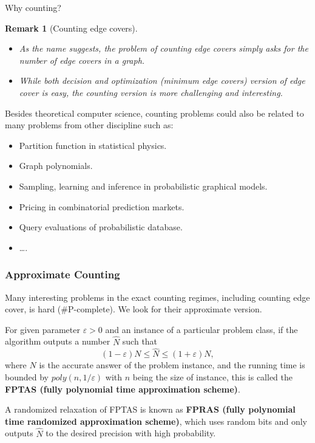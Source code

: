 \documentclass[mathserif]{beamer}
\newtheorem{remark}[theorem]{Remark}
\newcommand{\eps}{\varepsilon}
\begin{document}
\begin{frame}{Why counting?}
	\begin{remark}[Counting edge covers]
		\begin{itemize}
			\item As the name suggests, the problem of counting edge covers simply asks for the number of edge covers in a graph.
			\item While both decision and optimization (minimum edge covers) version of edge cover is easy, the counting version is more challenging and interesting.
		\end{itemize}
	\end{remark}

	\bigskip
	\pause
Besides theoretical computer science, counting problems could also be related to many problems from other discipline such as:
\begin{itemize}
	\item Partition function in statistical physics.
		\pause
	\item Graph polynomials.
		\pause
	\item Sampling, learning and inference in probabilistic graphical models.
		\pause
    \item Pricing in combinatorial prediction markets.
	\item Query evaluations of probabilistic database.
	\item \dots.
\end{itemize}
\end{frame}

\begin{frame}
	\frametitle{Approximate Counting}
	Many interesting problems in the exact counting regimes, including counting edge cover, is hard (\#P-complete).
	We look for their approximate version.
	\pause
	\begin{definition}[FPTAS]
		For given parameter $\eps > 0$ and an instance of a particular problem class, if the algorithm outputs a number $\hat{N}$ such that 
\[(1-\eps) N \leq \hat{N} \leq (1+\eps) N,\]
 where $N$ is the accurate answer of the problem instance, and the running time is bounded by $poly(n, 1/ \eps)$ with $n$ being the size of instance, this is called the {\bf FPTAS (fully polynomial time approximation scheme)}.

	\end{definition}
		A randomized relaxation of FPTAS is known as {\bf FPRAS (fully polynomial time randomized approximation scheme)}, which uses random bits and only outputs $\hat{N}$ to the desired precision with high probability.
\end{frame}
\end{document}
